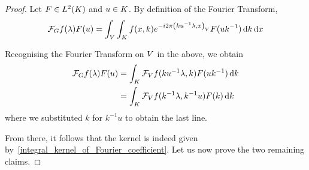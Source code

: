 \begin{proof}
    Let $F \in \Lebesgue{2}\CompactGroup$ and $u \in \CompactGroup$.
    By definition of the Fourier Transform,
    \begin{align*}
        \Fourier f(\lambda) F(u) =
        \int_\VectorSpace
            \int_\CompactGroup
                f(x, k) \e^{-\i \turn \ip{k u^{-1} \lambda}{x}} F(u k^{-1})
            \dd k
        \dd x
    \end{align*}

    Recognising the Fourier Transform on $\VectorSpace$ in the above, we obtain
    \begin{align*}
        \Fourier f(\lambda) F(u)
        &=
        \int_\CompactGroup
            \Fourier[\VectorSpace] f(k u^{-1} \lambda, k) F(u k^{-1})
        \dd k\\
        &=
        \int_\CompactGroup
            \Fourier[\VectorSpace] f(k^{-1} \lambda, k^{-1} u) F(k)
        \dd k
    \end{align*}
    where we substituted $k$ for $k^{-1} u$ to obtain the last line.

    From there, it follows that the kernel is indeed given by~\eqref{integral_kernel_of_Fourier_coefficient}.
    Let us now prove the two remaining claims.


\end{proof}

